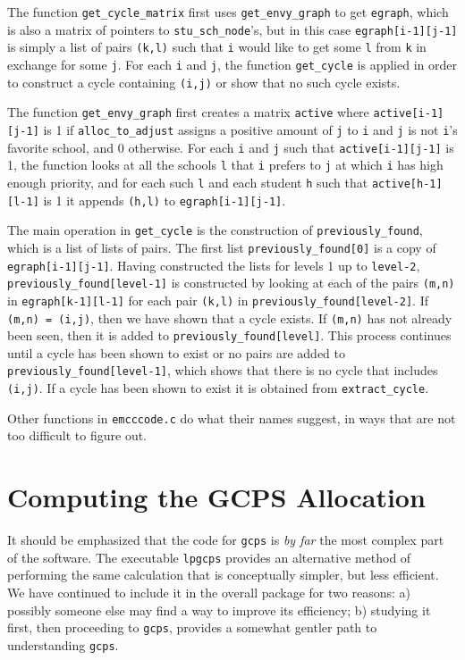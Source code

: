 \documentclass[12pt]{article}
\theoremstyle{definition}
\begin{document}
\begin{appendix}
The function \texttt{get\_cycle\_matrix} first uses
\texttt{get\_envy\_graph} to get \texttt{egraph}, which is also a
matrix of pointers to \texttt{stu\_sch\_node}'s, but in this case
\texttt{egraph[i-1][j-1]} is simply a list of pairs \texttt{(k,l)}
such that \texttt{i} would like to get some \texttt{l} from \texttt{k}
in exchange for some \texttt{j}.  For each \texttt{i} and \texttt{j},
the function \texttt{get\_cycle} is applied in order to construct a
cycle containing \texttt{(i,j)} or show that no such cycle exists.

The function \texttt{get\_envy\_graph} first creates a matrix
\texttt{active} where \texttt{active[i-1][j-1]} is 1 if
\texttt{alloc\_to\_adjust} assigns a positive amount of \texttt{j} to
\texttt{i} and \texttt{j} is not \texttt{i}'s favorite school, and 0
otherwise.  For each \texttt{i} and \texttt{j} such that
\texttt{active[i-1][j-1]} is 1, the function looks at all the schools
\texttt{l} that \texttt{i} prefers to \texttt{j} at which \texttt{i} has 
high enough priority, and for each such \texttt{l} and each student
\texttt{h} such that \texttt{active[h-1][l-1]} is 1 it appends
\texttt{(h,l)} to \texttt{egraph[i-1][j-1]}.

The main operation in \texttt{get\_cycle} is the construction of
\texttt{previously\_found}, which is a list of lists of pairs.  The
first list \texttt{previously\_found[0]} is a copy of
\texttt{egraph[i-1][j-1]}.  Having constructed the lists for levels 1
up to \texttt{level-2}, \texttt{previously\_found[level-1]} is
constructed by looking at each of the pairs \texttt{(m,n)} in
\texttt{egraph[k-1][l-1]} for each pair \texttt{(k,l)} in
\texttt{previously\_found[level-2]}.  If \texttt{(m,n) = (i,j)}, then
we have shown that a cycle exists.  If \texttt{(m,n)} has not already
been seen, then it is added to \texttt{previously\_found[level]}.
This process continues until a cycle has been shown to exist or no
pairs are added to \texttt{previously\_found[level-1]}, which shows
that there is no cycle that includes \texttt{(i,j)}.  If a cycle has
been shown to exist it is obtained from \texttt{extract\_cycle}.

Other functions in \texttt{emcccode.c} do what their names suggest, in
ways that are not too difficult to figure out.

\section{Computing the GCPS Allocation}

It should be emphasized that the code for \texttt{gcps} is \emph{by
far} the most complex part of the software.  The executable
\texttt{lpgcps} provides an alternative method of performing the same
calculation that is conceptually simpler, but less efficient.  We have
continued to include it in the overall package for two reasons: a)
possibly someone else may find a way to improve its efficiency; b)
studying it first, then proceeding to \texttt{gcps}, provides a
somewhat gentler path to understanding \texttt{gcps}.


\end{appendix}
\end{document}
